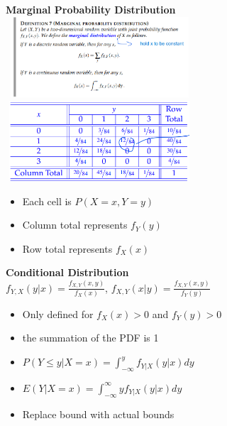 \documentclass[10pt, landscape]{article}
\begin{document}
\begin{multicols}{4}
\textbf{Marginal Probability Distribution} \newline
\includegraphics[width=7cm, height=3cm]{joint_marginal.png} 
\includegraphics[width=7cm, height=3cm]{joint_marginal_table.png}
\begin{itemize}
  \item Each cell is $P(X=x, Y=y)$
  \item Column total represents $f_Y(y)$
  \item Row total represents $f_X(x)$
\end{itemize}

\textbf{Conditional Distribution} \\
$f_{Y,X}(y|x)=\frac{f_{X,Y}(x,y)}{f_X(x)}$, $f_{X,Y}(x|y)=\frac{f_{X,Y}(x,y)}{f_Y(y)}$ \\
\begin{itemize}
  \item Only defined for $f_X(x)>0$ and $f_Y(y)>0$
  \item the summation of the PDF is 1
  \item $P(Y \le y|X=x)= \int_{-\infty}^{y}f_{Y|X}(y|x)dy$
  \item $E(Y|X=x)=\int_{-\infty}^{\infty}yf_{Y|X}(y|x)dy$
  \item Replace bound with actual bounds
\end{itemize}



\end{multicols}
\end{document}
